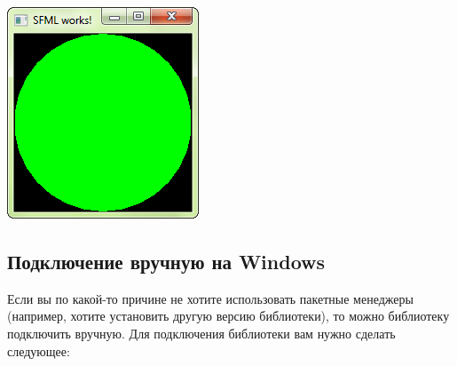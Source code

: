 \documentclass{article}
\begin{document}
\begin{center}
\includegraphics[scale=0.5]{../images/sfml_works.png}
\end{center}


\subsection*{Подключение вручную на Windows}
Если вы по какой-то причине не хотите использовать пакетные менеджеры (например, хотите установить другую версию библиотеки), то можно библиотеку подключить вручную. Для подключения библиотеки вам нужно сделать следующее:
\end{document}
